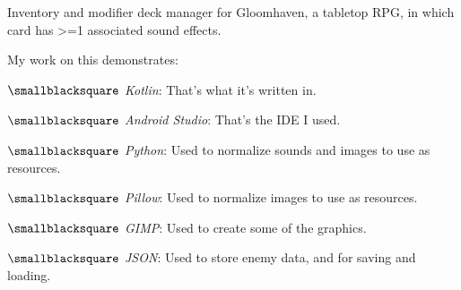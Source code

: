 \documentclass[10mm,letterpaper,notitlepage]{article}
\begin{document}
{{								\setlength{\parindent}{\parindent-4mm}
							\par}
							{\color[RGB]{0, 0, 0}
							\fontsize{2.25mm}{3.0mm}\selectfont
									{\color[RGB]{108, 29, 169}
									\fontsize{4.5mm}{6.0mm}\selectfont
									\color[RGB]{99, 92, 183}{{ }}\color[RGB]{106, 53, 173}{{ }}
									\par}
							\nopagebreak
							Inventory and modifier deck manager for Gloomhaven, a tabletop RPG, in which card has >=1 associated sound effects.
							
							\nopagebreak
							My work on this demonstrates:
								\setlength{\parindent}{\parindent+4mm}
								
								\nopagebreak
								$\smallblacksquare$ \textit{Kotlin}: That's what it's written in.
								
								$\smallblacksquare$ \textit{Android Studio}: That's the IDE I used.
								
								$\smallblacksquare$ \textit{Python}: Used to normalize sounds and images to use as resources.
								
								$\smallblacksquare$ \textit{Pillow}: Used to normalize images to use as resources.
								
								$\smallblacksquare$ \textit{GIMP}: Used to create some of the graphics.
								
								$\smallblacksquare$ \textit{JSON}: Used to store enemy data, and for saving and loading.
								
}}
\end{document}
